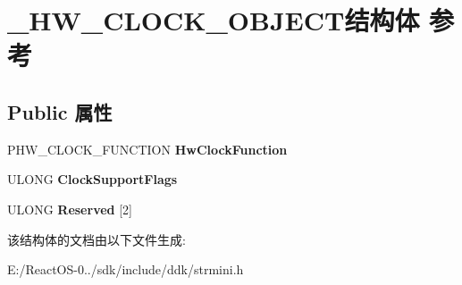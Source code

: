 \hypertarget{struct___h_w___c_l_o_c_k___o_b_j_e_c_t}{}\section{\+\_\+\+H\+W\+\_\+\+C\+L\+O\+C\+K\+\_\+\+O\+B\+J\+E\+C\+T结构体 参考}
\label{struct___h_w___c_l_o_c_k___o_b_j_e_c_t}
\subsection*{Public 属性}
\begin{DoxyCompactItemize}
\item 
\mbox{\label{struct___h_w___c_l_o_c_k___o_b_j_e_c_t_ad3af5c04fbe4f8738e57007d8dc44256}} 
P\+H\+W\+\_\+\+C\+L\+O\+C\+K\+\_\+\+F\+U\+N\+C\+T\+I\+ON {\bfseries Hw\+Clock\+Function}
\item 
\mbox{\label{struct___h_w___c_l_o_c_k___o_b_j_e_c_t_a7b7c5eced1268dce48d01f8f364d5784}} 
U\+L\+O\+NG {\bfseries Clock\+Support\+Flags}
\item 
\mbox{\label{struct___h_w___c_l_o_c_k___o_b_j_e_c_t_a365e245b5ddc267d771a31a408262f94}} 
U\+L\+O\+NG {\bfseries Reserved} \mbox{[}2\mbox{]}
\end{DoxyCompactItemize}


该结构体的文档由以下文件生成\+:\begin{DoxyCompactItemize}
\item 
E\+:/\+React\+O\+S-\/0../sdk/include/ddk/strmini.\+h\end{DoxyCompactItemize}
